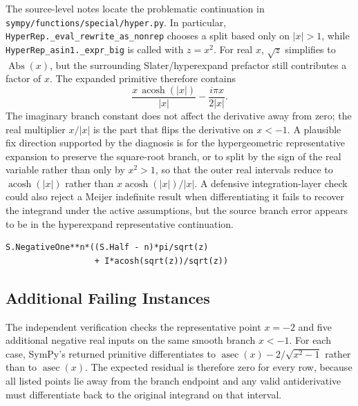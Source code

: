 \documentclass[11pt]{article}
\begin{document}
The source-level notes locate the problematic continuation in
\nolinkurl{sympy/functions/special/hyper.py}.  In particular,
\texttt{HyperRep.\_eval\_rewrite\_as\_nonrep} chooses a split based only on
\(\lvert x\rvert>1\), while \texttt{HyperRep\_asin1.\_expr\_big} is called with
\(z=x^2\).  For real \(x\), \(\sqrt{z}\) simplifies to \(\operatorname{Abs}(x)\),
but the surrounding Slater/hyperexpand prefactor still contributes a factor of
\(x\).  The expanded primitive therefore contains
\[
  \frac{x\,\operatorname{acosh}(|x|)}{|x|}
  - \frac{i\pi x}{2|x|}.
\]
The imaginary branch constant does not affect the derivative away from zero;
the real multiplier \(x/|x|\) is the part that flips the derivative on
\(x<-1\).  A plausible fix direction supported by the diagnosis is for the
hypergeometric representative expansion to preserve the square-root branch, or
to split by the sign of the real variable rather than only by \(x^2>1\), so that
the outer real intervals reduce to \(\operatorname{acosh}(|x|)\) rather than
\(x\operatorname{acosh}(|x|)/|x|\).  A defensive integration-layer check could
also reject a Meijer indefinite result when differentiating it fails to recover
the integrand under the active assumptions, but the source branch error appears
to be in the hyperexpand representative continuation.

\begin{lstlisting}[style=bugpython]
S.NegativeOne**n*((S.Half - n)*pi/sqrt(z)
                  + I*acosh(sqrt(z))/sqrt(z))
\end{lstlisting}

\subsection{Additional Failing Instances}

The independent verification checks the representative point \(x=-2\) and five
additional negative real inputs on the same smooth branch \(x<-1\).  For each
case, SymPy's returned primitive differentiates to
\(\operatorname{asec}(x)-2/\sqrt{x^2-1}\) rather than to
\(\operatorname{asec}(x)\).  The expected residual is therefore zero for every
row, because all listed points lie away from the branch endpoint and any valid
antiderivative must differentiate back to the original integrand on that
interval.
\end{document}
